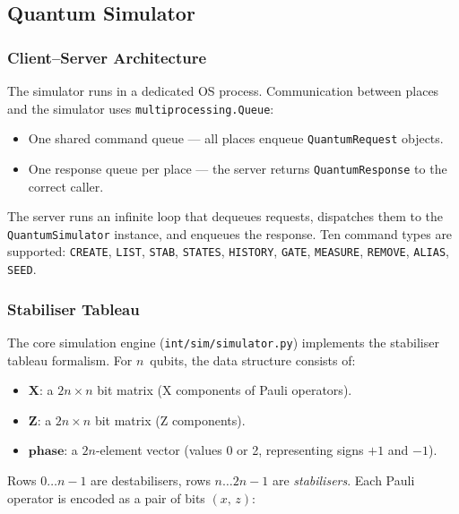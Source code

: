 \subsection{Quantum Simulator}
\label{sec:impl-simulator}

\subsubsection{Client--Server Architecture}

The simulator runs in a dedicated OS process.  Communication
between places and the simulator uses \texttt{multiprocessing.Queue}:

\begin{itemize}
    \item One shared command queue --- all places enqueue
          \texttt{QuantumRequest} objects.
    \item One response queue per place --- the server returns
          \texttt{QuantumResponse} to the correct caller.
\end{itemize}

The server runs
an infinite loop that dequeues requests, dispatches them to the
\texttt{QuantumSimulator} instance, and enqueues the response.
Ten command types are supported: \texttt{CREATE}, \texttt{LIST},
\texttt{STAB}, \texttt{STATES}, \texttt{HISTORY}, \texttt{GATE},
\texttt{MEASURE}, \texttt{REMOVE}, \texttt{ALIAS}, \texttt{SEED}.

\subsubsection{Stabiliser Tableau}

The core simulation engine (\texttt{int/sim/simulator.py}) implements the
stabiliser tableau formalism.  For $n$~qubits, the data structure
consists of:

\begin{itemize}
    \item $\mathbf{X}$: a $2n \times n$ bit matrix (X components of Pauli
          operators).
    \item $\mathbf{Z}$: a $2n \times n$ bit matrix (Z components).
    \item $\mathbf{phase}$: a $2n$-element vector (values 0 or 2,
          representing signs $+1$ and $-1$).
\end{itemize}

Rows $0 \ldots n{-}1$ are destabilisers, rows $n \ldots 2n{-}1$
are \emph{stabilisers}.  Each Pauli operator is encoded as a pair of
bits $(x,\,z)$:

